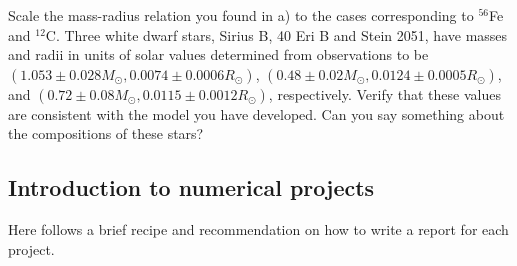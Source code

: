 \documentclass[%
oneside,                 %
final,                   %
10pt]{article}
\begin{document}
\noindent
Scale the mass-radius relation you found in a) to the cases corresponding to $^{56}$Fe and
$^{12}$C. Three white dwarf stars, Sirius B, 40 Eri B and Stein 2051, have masses and radii
in units of solar values determined from observations to be
$(1.053\pm0.028 M_{\odot},0.0074\pm 0.0006 R_{\odot})$, $(0.48\pm0.02 M_{\odot},0.0124\pm 0.0005 R_{\odot})$,
and $(0.72\pm0.08 M_{\odot},0.0115\pm 0.0012 R_{\odot})$, respectively.
Verify that these values are consistent with the model you have developed. Can you say something about the
compositions of these stars?



\subsection*{Introduction to numerical projects}

Here follows a brief recipe and recommendation on how to write a report for each
project.
\end{document}
